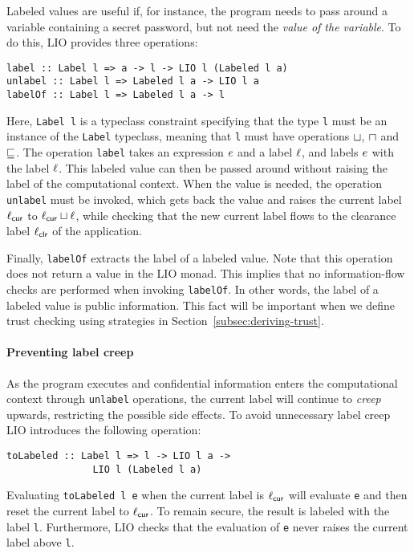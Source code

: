 Labeled values are useful if, for instance, the program needs to pass around a variable containing a secret password, but not need the \emph{value of the variable}.
To do this, LIO provides three operations:
\begin{verbatim}
label :: Label l => a -> l -> LIO l (Labeled l a)
unlabel :: Label l => Labeled l a -> LIO l a
labelOf :: Label l => Labeled l a -> l
\end{verbatim}
Here, \texttt{Label l} is a typeclass constraint specifying that the type \texttt{l} must be an instance of the \texttt{Label} typeclass, meaning that \texttt{l} must have operations $\sqcup$, $\sqcap$ and $\sqsubseteq$. The operation \texttt{label} takes an expression $e$ and a label $\ell$, and labels $e$ with the label $\ell$. This labeled value can then be passed around without raising the label of the computational context. When the value is needed, the operation \texttt{unlabel} must be invoked, which gets back the value and raises the current label $\ell_{\mathsf{cur}}$ to $\ell_{\mathsf{cur}} \sqcup \ell$, while checking that the new current label flows to the clearance label $\ell_{\mathsf{clr}}$ of the application.

Finally, \texttt{labelOf} extracts the label of a labeled value. Note that this operation does not return a value in the LIO monad. This implies that no information-flow checks are performed when invoking \texttt{labelOf}. In other words, the label of a labeled value is public information. This fact will be important when we define trust checking using strategies in Section~\ref{subsec:deriving-trust}.

\paragraph{Preventing label creep}
As the program executes and confidential information enters the computational context through \texttt{unlabel} operations, the current label will continue to \emph{creep} upwards, restricting the possible side effects. To avoid unnecessary label creep LIO introduces the following operation:
\begin{verbatim}
toLabeled :: Label l => l -> LIO l a ->
               LIO l (Labeled l a)
\end{verbatim}
Evaluating \texttt{toLabeled l e} when the current label is $\ell_{\mathsf{cur}}$ will evaluate \texttt{e} and then reset the current label to $\ell_{\mathsf{cur}}$. To remain secure, the result is labeled with the label \texttt{l}. Furthermore, LIO checks that the evaluation of \texttt{e} never raises the current label above \texttt{l}.